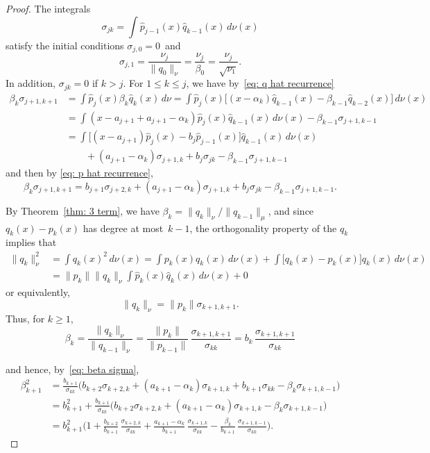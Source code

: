 \documentclass[12pt,a4paper]{article}
\begin{document}
\begin{proof}
The integrals
\[
\sigma_{jk}=\int\hat p_{j-1}(x)\hat q_{k-1}(x)\,d\nu(x)
\]
satisfy the initial conditions $\sigma_{j,0}=0$~and 
\[
\sigma_{j,1}=\frac{\nu_j}{\|q_0\|_\nu}
	=\frac{\nu_j}{\beta_0}=\frac{\nu_j}{\sqrt{\nu_1}}.
\]
In addition, $\sigma_{jk}=0$ if $k>j$. For $1\le k\le j$, we have 
by~\eqref{eq: q hat recurrence}
\begin{align*}
\beta_k\sigma_{j+1,k+1}&=\int\hat p_j(x)\beta_k\hat q_k(x)\,d\nu
	=\int\hat p_j(x)\bigl[
	(x-\alpha_k)\hat q_{k-1}(x)-\beta_{k-1}\hat q_{k-2}(x)\bigr]\,d\nu(x)\\
	&=\int(x-a_{j+1}+a_{j+1}-\alpha_k)
		\hat p_j(x)\hat q_{k-1}(x)\,d\nu(x)
		-\beta_{k-1}\sigma_{j+1,k-1}\\
	&=\int\bigl[(x-a_{j+1})\hat p_j(x)-b_j\hat p_{j-1}(x)\bigr]
		\hat q_{k-1}(x)\,d\nu(x)\\
	&\qquad{}+(a_{j+1}-\alpha_k)\sigma_{j+1,k}
		+b_j\sigma_{jk}-\beta_{k-1}\sigma_{j+1,k-1}
\end{align*}
and then by \eqref{eq: p hat recurrence},
\begin{equation}\label{eq: beta sigma}
\beta_k\sigma_{j+1,k+1}=b_{j+1}\sigma_{j+2,k}
	+(a_{j+1}-\alpha_k)\sigma_{j+1,k}
		+b_j\sigma_{jk}-\beta_{k-1}\sigma_{j+1,k-1}.
\end{equation}

By Theorem~\ref{thm: 3 term}, we have 
$\beta_k=\|q_k\|_\nu/\|q_{k-1}\|_\mu$, and since $q_k(x)-p_k(x)$ has degree at 
most~$k-1$, the orthogonality property of the $q_k$ implies that
\begin{align*}
\|q_k\|_\nu^2&=\int q_k(x)^2\,d\nu(x)=\int p_k(x)q_k(x)\,d\nu(x)
	+\int\bigl[q_k(x)-p_k(x)\bigr]q_k(x)\,d\nu(x)\\
	&=\|p_k\|\|q_k\|_\nu\int\hat p_k(x)\hat q_k(x)\,d\nu(x)+0
\end{align*}
or equivalently, 
\begin{equation}\label{eq: norm pk qk}
\|q_k\|_\nu=\|p_k\|\sigma_{k+1,k+1}.
\end{equation}
Thus, for $k\ge1$,
\[
\beta_k=\frac{\|q_k\|_\nu}{\|q_{k-1}\|_\nu}
	=\frac{\|p_k\|}{\|p_{k-1}\|}\, 
		\frac{\sigma_{k+1,k+1}}{\sigma_{kk}}
	=b_k\,\frac{\sigma_{k+1,k+1}}{\sigma_{kk}}
\]




and hence, by~\eqref{eq: beta sigma},
\begin{align*}
\beta_{k+1}^2&=\frac{b_{k+1}}{\sigma_{kk}}\biggl(
	b_{k+2}\sigma_{k+2,k}+(a_{k+1}-\alpha_k)\sigma_{k+1,k}
	+b_{k+1}\sigma_{kk}-\beta_k\sigma_{k+1,k-1}\biggr)\\
	&=b_{k+1}^2+\frac{b_{k+1}}{\sigma_{kk}}\biggl(
	b_{k+2}\sigma_{k+2,k}+(a_{k+1}-\alpha_k)\sigma_{k+1,k}
	-\beta_k\sigma_{k+1,k-1}\biggr)\\
	&=b_{k+1}^2\biggl(1
		+\frac{b_{k+2}}{b_{k+1}}\,\frac{\sigma_{k+2,k}}{\sigma_{kk}}
		+\frac{a_{k+1}-\alpha_k}{b_{k+1}}\,
			\frac{\sigma_{k+1,k}}{\sigma_{kk}}
		-\frac{\beta_k}{b_{k+1}}\,
			\frac{\sigma_{k+1,k-1}}{\sigma_{kk}}\biggr).
\end{align*}


\end{proof}
\end{document}

